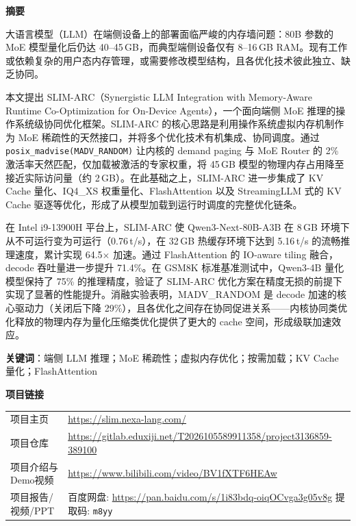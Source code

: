 \begin{center}
{\Large \kaishu \bfseries 摘\quad 要}
\end{center}

\vspace{1em}

大语言模型（LLM）在端侧设备上的部署面临严峻的内存墙问题：80B 参数的 MoE 模型量化后仍达 40--45\,GB，而典型端侧设备仅有 8--16\,GB RAM。现有工作或依赖复杂的用户态内存管理，或需要修改模型结构，且各优化技术彼此独立、缺乏协同。

本文提出 SLIM-ARC（Synergistic LLM Integration with Memory-Aware Runtime Co-Optimization for On-Device Agents），一个面向端侧 MoE 推理的操作系统级协同优化框架。SLIM-ARC 的核心思路是利用操作系统虚拟内存机制作为 MoE 稀疏性的天然接口，并将多个优化技术有机集成、协同调度。通过 \texttt{posix\_madvise(MADV\_RANDOM)} 让内核的 demand paging 与 MoE Router 的 2\% 激活率天然匹配，仅加载被激活的专家权重，将 45\,GB 模型的物理内存占用降至接近实际访问量（约 2\,GB）。在此基础之上，SLIM-ARC 进一步集成了 KV Cache 量化、IQ4\_XS 权重量化、FlashAttention 以及 StreamingLLM 式的 KV Cache 驱逐等优化，形成了从模型加载到运行时调度的完整优化链条。

在 Intel i9-13900H 平台上，SLIM-ARC 使 Qwen3-Next-80B-A3B 在 8\,GB 环境下从不可运行变为可运行（0.76\,t/s），在 32\,GB 热缓存环境下达到 5.16\,t/s 的流畅推理速度，累计实现 64.5$\times$ 加速。通过 FlashAttention 的 IO-aware tiling 融合，decode 吞吐量进一步提升 71.4\%。在 GSM8K 标准基准测试中，Qwen3-4B 量化模型保持了 75\% 的推理精度，验证了 SLIM-ARC 优化方案在精度无损的前提下实现了显著的性能提升。消融实验表明，MADV\_RANDOM 是 decode 加速的核心驱动力（关闭后下降 29\%），且各优化之间存在协同促进关系——内核协同类优化释放的物理内存为量化压缩类优化提供了更大的 cache 空间，形成级联加速效应。

\vspace{1em}

\noindent\textbf{关键词}：端侧 LLM 推理；MoE 稀疏性；虚拟内存优化；按需加载；KV Cache 量化；FlashAttention

\vspace{1.5em}

\noindent\textbf{项目链接}\\[0.3em]
\begin{tabular}{@{}ll@{}}
项目主页 & \url{https://slim.nexa-lang.com/} \\
项目仓库 & \url{https://gitlab.eduxiji.net/T2026105589911358/project3136859-389100} \\
项目介绍与Demo视频 & \url{https://www.bilibili.com/video/BV1fXTF6HEAw} \\
项目报告/视频/PPT & 百度网盘: \url{https://pan.baidu.com/s/1i83bdq-oiqOCvga3g05v8g} \quad 提取码: \texttt{m8yy} \\
\end{tabular}

\newpage
